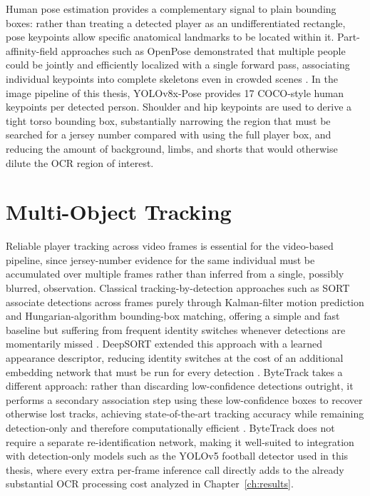 Human pose estimation provides a complementary signal to plain bounding
boxes: rather than treating a detected player as an undifferentiated
rectangle, pose keypoints allow specific anatomical landmarks to be
located within it. Part-affinity-field approaches such as OpenPose
demonstrated that multiple people could be jointly and efficiently
localized with a single forward pass, associating individual keypoints
into complete skeletons even in crowded scenes \cite{cao2017openpose}.
In the image pipeline of this thesis, YOLOv8x-Pose provides 17
COCO-style human keypoints per detected person. Shoulder and hip
keypoints are used to derive a tight torso bounding box, substantially
narrowing the region that must be searched for a jersey number compared
with using the full player box, and reducing the amount of background,
limbs, and shorts that would otherwise dilute the OCR region of
interest.

\section{Multi-Object Tracking}

Reliable player tracking across video frames is essential for the
video-based pipeline, since jersey-number evidence for the same
individual must be accumulated over multiple frames rather than
inferred from a single, possibly blurred, observation. Classical
tracking-by-detection approaches such as SORT associate detections
across frames purely through Kalman-filter motion prediction and
Hungarian-algorithm bounding-box matching, offering a simple and fast
baseline but suffering from frequent identity switches whenever
detections are momentarily missed \cite{bewley2016sort}. DeepSORT
extended this approach with a learned appearance descriptor, reducing
identity switches at the cost of an additional embedding network that
must be run for every detection \cite{wojke2017deepsort}. ByteTrack
takes a different approach: rather than discarding low-confidence
detections outright, it performs a secondary association step using
these low-confidence boxes to recover otherwise lost tracks, achieving
state-of-the-art tracking accuracy while remaining detection-only and
therefore computationally efficient \cite{zhang2022bytetrack}.
ByteTrack does not require a separate re-identification network, making
it well-suited to integration with detection-only models such as the
YOLOv5 football detector used in this thesis, where every extra
per-frame inference call directly adds to the already substantial OCR
processing cost analyzed in Chapter~\ref{ch:results}.

